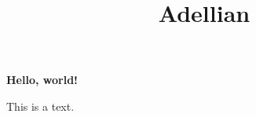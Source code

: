 \documentclass[12pt]{article}
\begin{document}
	\title{Adellian}
	\textbf{Hello, world!}

	This is a text.
\end{document}

